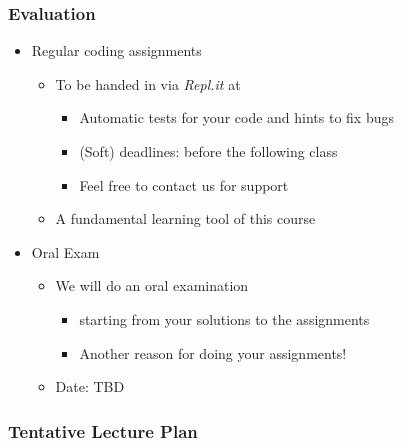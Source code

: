 \documentclass{beamer}%
\begin{document}
\begin{frame}
  \frametitle{Evaluation}

  \begin{itemize}
  \item Regular coding assignments
    \begin{itemize}
    \item To be handed in via \emph{Repl.it} at \myurl{\replstudents}
    \begin{itemize}
	\item Automatic tests for your code and hints to fix bugs
    \item (Soft) deadlines: before the following class
    \item Feel free to contact us for support
	\end{itemize}
	\item {\color{red}A fundamental learning tool of this course}
    \end{itemize}
  \item Oral Exam
    \begin{itemize}
	\item We will do an oral examination
	    \begin{itemize}
	   \item  starting from your solutions to the assignments 	
	   \item {\color{red}Another reason for doing your assignments!}
    	\end{itemize}
    \item Date: TBD
  \end{itemize}
    \end{itemize}
\end{frame}



\begin{frame}
  \frametitle{Tentative Lecture Plan}
  \centering
    
\end{frame}
\end{document}
